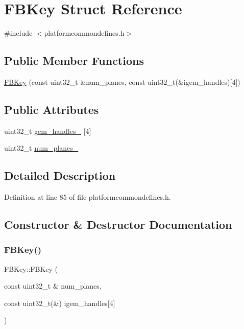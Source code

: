 \hypertarget{structFBKey}{}\section{F\+B\+Key Struct Reference}
\label{structFBKey}


{\ttfamily \#include $<$platformcommondefines.\+h$>$}

\subsection*{Public Member Functions}
\begin{DoxyCompactItemize}
\item 
\mbox{\hyperlink{structFBKey_a1b7fd45290caeb682dd7d23bcc567d4d}{F\+B\+Key}} (const uint32\+\_\+t \&num\+\_\+planes, const uint32\+\_\+t(\&igem\+\_\+handles)\mbox{[}4\mbox{]})
\end{DoxyCompactItemize}
\subsection*{Public Attributes}
\begin{DoxyCompactItemize}
\item 
uint32\+\_\+t \mbox{\hyperlink{structFBKey_af9c338051a21174ecb54479cf78116c8}{gem\+\_\+handles\+\_\+}} \mbox{[}4\mbox{]}
\item 
uint32\+\_\+t \mbox{\hyperlink{structFBKey_a3d3bda0ee29a63ca3f9c676d23a472e3}{num\+\_\+planes\+\_\+}}
\end{DoxyCompactItemize}


\subsection{Detailed Description}


Definition at line 85 of file platformcommondefines.\+h.



\subsection{Constructor \& Destructor Documentation}
\mbox{\label{structFBKey_a1b7fd45290caeb682dd7d23bcc567d4d}} 
\subsubsection{\texorpdfstring{F\+B\+Key()}{FBKey()}}
{\footnotesize\ttfamily F\+B\+Key\+::\+F\+B\+Key (\begin{DoxyParamCaption}\item[{const uint32\+\_\+t \&}]{num\+\_\+planes,  }\item[{const uint32\+\_\+t(\&)}]{igem\+\_\+handles\mbox{[}4\mbox{]} }\end{DoxyParamCaption})\hspace{0.3cm}{\ttfamily [inline]}}



